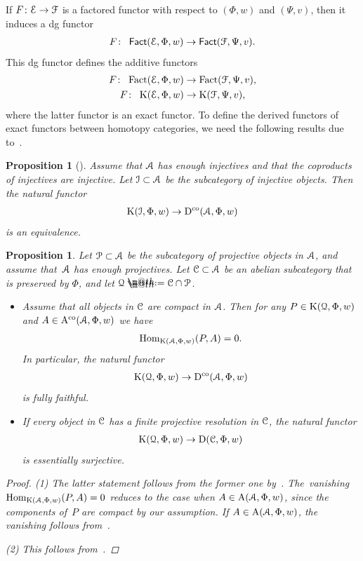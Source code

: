 \documentclass[11pt]{article}
\makeatletter
\numberwithin{equation}{section}
\newtheorem{prop}[dfn]{Proposition}
\newcommand*{\defeq}{\mathrel{\rlap{%
 \raisebox{0.3ex}{$\m@th\cdot$}}%
 \raisebox{-0.3ex}{$\m@th\cdot$}}%
 =}
\numberwithin{equation}{section}
\newcommand{\Fact}{\operatorname{Fact}}
\newcommand{\dgFact}{\operatorname{\sf{Fact}}}
\newcommand{\Hom}{\operatorname{Hom}}
\newcommand{\Dco}{\operatorname{D^{co}}}
\newcommand{\D}{\operatorname{D}}
\newcommand{\Aco}{\operatorname{A^{co}}}
\newcommand{\A}{\operatorname{A}}
\newcommand{\K}{\operatorname{K}}
\newcommand{\scrA}{\EuScript{A}}
\newcommand{\scrC}{\EuScript{C}}
\newcommand{\scrE}{\EuScript{E}}
\newcommand{\scrF}{\EuScript{F}}
\newcommand{\scrI}{\EuScript{I}}
\newcommand{\scrP}{\EuScript{P}}
\newcommand{\scrQ}{\EuScript{Q}}
\makeatother
\begin{document}
If $F\colon \scrE \to \scrF$ is a factored functor with respect to $(\Phi,w)$ and $(\Psi,v)$, then it induces a dg functor
\begin{gather*}
F\colon\ \dgFact(\scrE,\Phi,w)\to\dgFact(\scrF,\Psi,v).
\end{gather*}
This dg functor defines the additive functors
\begin{gather*}
F\colon\ \Fact(\scrE,\Phi,w)\to\Fact(\scrF,\Psi,v),
\\
F\colon\ \K(\scrE,\Phi,w)\to\K(\scrF,\Psi,v),
\end{gather*}
where the latter functor is an exact functor. To define the derived functors of exact functors between homotopy categories, we need the following results due to~\cite{bdfik}.

\begin{prop}[{\cite[Corollary~2.25]{bdfik}}]\label{inj resol}
Assume that $\scrA$ has enough injectives and that the coproducts of injectives are injective. Let $\scrI\subset \scrA$ be the subcategory of injective objects. Then the natural functor
\begin{gather*}
\K(\scrI,\Phi,w)\to\Dco(\scrA,\Phi,w)
\end{gather*}
is an equivalence.
\end{prop}

\begin{prop}\label{proj resol}
Let $\scrP\subset \scrA$ be the subcategory of projective objects in $\scrA$, and assume that~$\scrA$ has enough projectives. Let $\scrC\subset \scrA$ be an abelian subcategory that is preserved by $\Phi$, and let $\scrQ\defeq\scrC\cap \scrP$.
\begin{itemize}\itemsep=0pt
\item[$1.$] Assume that all objects in $\scrC$ are compact in $\scrA$. Then for any $P\in \K(\scrQ,\Phi,w)$ and $A\in \Aco(\scrA,\Phi,w)$ we have
\begin{gather*}
\Hom_{\K(\scrA,\Phi,w)}(P,A)=0.
\end{gather*}
In particular,
the natural functor
\begin{gather*}
\K(\scrQ,\Phi,w)\to\Dco(\scrA,\Phi,w)
\end{gather*}
is fully faithful.

\item[$2.$] If every object in $\scrC$ has a finite projective resolution in $\scrC$, the natural functor
\begin{gather*}
\K(\scrQ,\Phi,w)\to\D(\scrC,\Phi,w)
\end{gather*}
is essentially surjective.
\end{itemize}
\begin{proof}
(1) The latter statement follows from the former one by~\cite[Proposition~B.2]{ls}. The~vani\-shing $\Hom_{\K(\scrA,\Phi,w)}(P,A)=0$ reduces to the case when $A\in \A(\scrA,\Phi,w)$, since the components of~$P$ are compact by our assumption. If $A\in \A(\scrA,\Phi,w)$, the vanishing follows from~\cite[Lemma~2.4]{bdfik}.

(2) This follows from~\cite[Proposition~2.22]{bdfik}.
\end{proof}
\end{prop}
\end{document}

